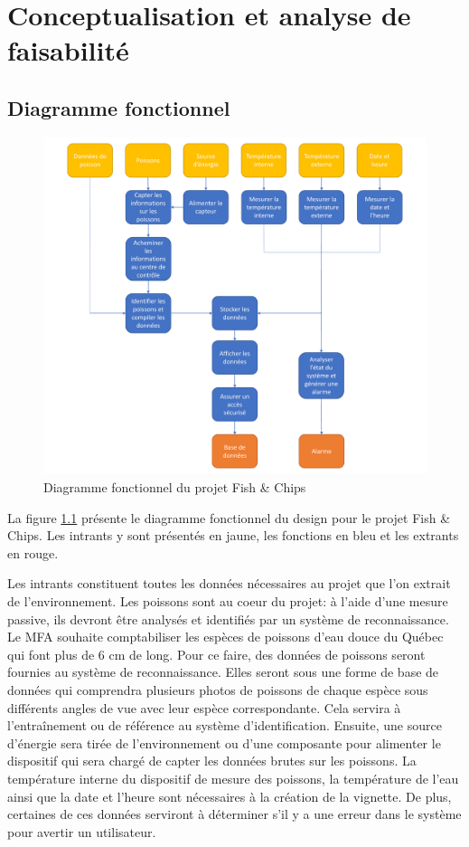 
%
%

\chapter{Conceptualisation et analyse de faisabilité}
\label{s:conceptualisation_et_analyse}

\section{Diagramme fonctionnel}

\begin{figure}[!htb]
    \centering
    \includegraphics[width=0.80\linewidth]{fig/Diagramme_fonctionnel.pdf}
    \caption{Diagramme fonctionnel du projet Fish \& Chips}
    \label{fig:diagramme_fonctionnel}
\end{figure}

La figure \ref{fig:diagramme_fonctionnel} présente le diagramme fonctionnel du design pour le projet Fish \& Chips. Les intrants y sont présentés en jaune, les fonctions en bleu et les extrants en rouge.

Les intrants constituent toutes les données nécessaires au projet que l'on extrait de l'environnement. Les poissons sont au coeur du projet: à l'aide d'une mesure passive, ils devront être analysés et identifiés par un système de reconnaissance. Le MFA souhaite comptabiliser les espèces de poissons d'eau douce du Québec qui font plus de 6 cm de long. Pour ce faire, des données de poissons seront fournies au système de reconnaissance. Elles seront sous une forme de base de données qui comprendra plusieurs photos de poissons de chaque espèce sous différents angles de vue avec leur espèce correspondante. Cela servira à l'entraînement ou de référence au système d'identification. Ensuite, une source d'énergie sera tirée de l'environnement ou d'une composante pour alimenter le dispositif qui sera chargé de capter les données brutes sur les poissons. La température interne du dispositif de mesure des poissons, la température de l'eau ainsi que la date et l'heure sont nécessaires à la création de la vignette. De plus, certaines de ces données serviront à déterminer s'il y a une erreur dans le système pour avertir un utilisateur.

